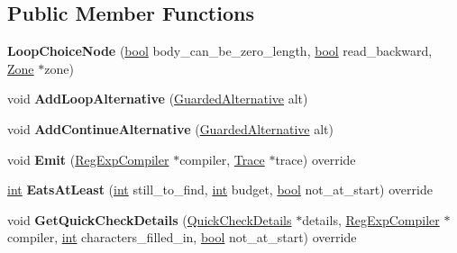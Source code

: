 \subsection*{Public Member Functions}
\begin{DoxyCompactItemize}
\item 
\mbox{\label{classv8_1_1internal_1_1LoopChoiceNode_a6145f60393ade0f9ff2d1a674f8e7822}} 
{\bfseries Loop\+Choice\+Node} (\mbox{\hyperlink{classbool}{bool}} body\+\_\+can\+\_\+be\+\_\+zero\+\_\+length, \mbox{\hyperlink{classbool}{bool}} read\+\_\+backward, \mbox{\hyperlink{classv8_1_1internal_1_1Zone}{Zone}} $\ast$zone)
\item 
\mbox{\label{classv8_1_1internal_1_1LoopChoiceNode_a815bc1ebd29be2a63d8d69991c3a44c1}} 
void {\bfseries Add\+Loop\+Alternative} (\mbox{\hyperlink{classv8_1_1internal_1_1GuardedAlternative}{Guarded\+Alternative}} alt)
\item 
\mbox{\label{classv8_1_1internal_1_1LoopChoiceNode_a30882e49330a344892de6024e1a9138c}} 
void {\bfseries Add\+Continue\+Alternative} (\mbox{\hyperlink{classv8_1_1internal_1_1GuardedAlternative}{Guarded\+Alternative}} alt)
\item 
\mbox{\label{classv8_1_1internal_1_1LoopChoiceNode_ab0ad73ab250cdfc4ef4ae46df8c752ba}} 
void {\bfseries Emit} (\mbox{\hyperlink{classv8_1_1internal_1_1RegExpCompiler}{Reg\+Exp\+Compiler}} $\ast$compiler, \mbox{\hyperlink{classv8_1_1internal_1_1Trace}{Trace}} $\ast$trace) override
\item 
\mbox{\label{classv8_1_1internal_1_1LoopChoiceNode_ac27107bc53da010625bc70c31afea7fa}} 
\mbox{\hyperlink{classint}{int}} {\bfseries Eats\+At\+Least} (\mbox{\hyperlink{classint}{int}} still\+\_\+to\+\_\+find, \mbox{\hyperlink{classint}{int}} budget, \mbox{\hyperlink{classbool}{bool}} not\+\_\+at\+\_\+start) override
\item 
\mbox{\label{classv8_1_1internal_1_1LoopChoiceNode_a86d33da8647bdd21b010ca5a8af238fb}} 
void {\bfseries Get\+Quick\+Check\+Details} (\mbox{\hyperlink{classv8_1_1internal_1_1QuickCheckDetails}{Quick\+Check\+Details}} $\ast$details, \mbox{\hyperlink{classv8_1_1internal_1_1RegExpCompiler}{Reg\+Exp\+Compiler}} $\ast$compiler, \mbox{\hyperlink{classint}{int}} characters\+\_\+filled\+\_\+in, \mbox{\hyperlink{classbool}{bool}} not\+\_\+at\+\_\+start) override

\end{DoxyCompactItemize}
